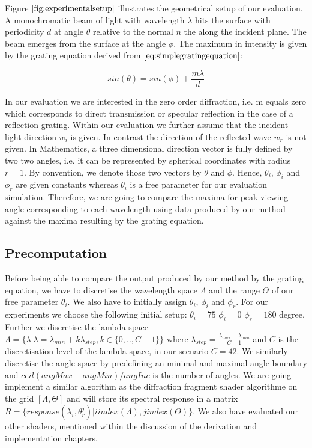 Figure $\ref{fig:experimentalsetup}$ illustrates the geometrical setup of our evaluation. A monochromatic beam of light with wavelength $\lambda$ hits the surface with periodicity $d$ at angle $\theta$ relative to the normal $n$ the along the incident plane. The beam emerges from the surface at the angle $\phi$. The maximum in intensity is given by the grating equation derived from $\ref{eq:simplegratingequation}$: 

\begin{equation}
  sin(\theta) = sin(\phi) + \frac{m \lambda}{d}
\label{eq:gratingeq}
\end{equation}

In our evaluation we are interested in the zero order diffraction, i.e. m equals zero which corresponds to direct transmission or specular reflection in the case of a reflection grating. 
Within our evaluation we further assume that the incident light direction $w_i$ is given. In contrast the direction of the reflected wave $w_r$ is not given.
In Mathematics, a three dimensional direction vector is fully defined by two two angles, i.e. it can be represented by spherical coordinates with radius $r = 1$. By convention, we denote those two vectors by $\theta$ and $\phi$. Hence, $\theta_i$, $\phi_i$ and $\phi_r$ are given constants whereas $\theta_i$ is a free parameter for our evaluation simulation. Therefore, we are going to compare the maxima for peak viewing angle corresponding to each wavelength using data produced by our method against the maxima resulting by the grating equation.

\subsection{Precomputation}
Before being able to compare the output produced by our method by the grating equation, we have to discretise the wavelength space $\Lambda$ and the range $\Theta$ of our free parameter $\theta_i$. We also have to initially assign  $\theta_i$, $\phi_i$ and $\phi_r$. For our experiments we choose the following initial setup: $\theta_i = 75$ $\phi_i = 0$ $\phi_r = 180$ degree.
Further we discretise the lambda space $\Lambda = \{\lambda | \lambda = \lambda_{min} + k\lambda_{step}, k \in \{0,..,C-1\}\}$ where $\lambda_{step} = \frac{\lambda_{max}-\lambda_{min}}{C-1}$ and $C$ is the discretisation level of the lambda space, in our scenario $C = 42$. We similarly discretise the angle space by predefining an minimal and maximal angle boundary and $ceil(angMax - angMin) / angInc$ is the number of angles. 
We are going implement a similar algorithm as the diffraction fragment shader algorithme on the grid $[\Lambda, \Theta]$ and will store its spectral response in a matrix $R = \{response(\lambda_i, \theta_{r}^{j}) | i index(\Lambda), j index(\Theta)\}$. We also have evaluated our other shaders, mentioned within the discussion of the derivation and implementation chapters.


